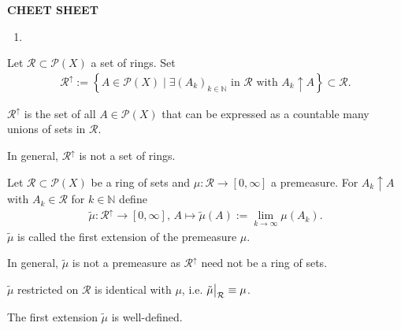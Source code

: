 \textbf{CHEET SHEET}
\begin{enumerate}
    \item 
\end{enumerate}

\begin{definition}
    Let \(\mathcal{R} \subset \mathcal{P}(X)\) a set of rings. Set
    \begin{align}
        \mathcal{R}^{\uparrow} := \left\{ A \in \mathcal{P}(X) \mid \exists (A_k)_{k \in \mathbb{N}} \text{ in } \mathcal{R} \text{ with } A_k \uparrow A \right\} \subset \mathcal{R} \text{.}
    \end{align}
\end{definition}
\begin{remark}
    \(\mathcal{R}^\uparrow\) is the set of all \(A \in \mathcal{P}(X)\) that can be expressed as a countable many unions of sets in \(\mathcal{R}\).

    In general, \(\mathcal{R}^\uparrow\) is not a set of rings.
\end{remark}
\begin{definition}
    Let \(\mathcal{R} \subset \mathcal{P}(X)\) be a ring of sets and \(\mu: \mathcal{R} \rightarrow [0, \infty]\) a premeasure. For \(A_k \uparrow A\) with \(A_k \in \mathcal{R}\) for \(k \in \mathbb{N}\) define
    \begin{align}
        \tilde{\mu}: \mathcal{R}^\uparrow \rightarrow [0, \infty], \, A \mapsto \tilde{\mu}(A) := \lim_{k \rightarrow \infty} \mu(A_k)\text{.}
    \end{align}
    \(\tilde{\mu}\) is called the first extension of the premeasure \(\mu\).
\end{definition}
\begin{remark}
    In general, \(\tilde{\mu}\) is not a premeasure as \(\mathcal{R}^\uparrow\) need not be a ring of sets.

    \(\tilde{\mu}\) restricted on \(\mathcal{R}\) is identical with \(\mu\), i.e. \(\restr{\tilde{\mu}}{\mathcal{R}} \equiv \mu \).
\end{remark}
\begin{lemma}
    The first extension \(\tilde{\mu}\) is well-defined.
\end{lemma}
\begin{proposition}
    
\end{proposition}
\begin{proposition}
    
\end{proposition}
